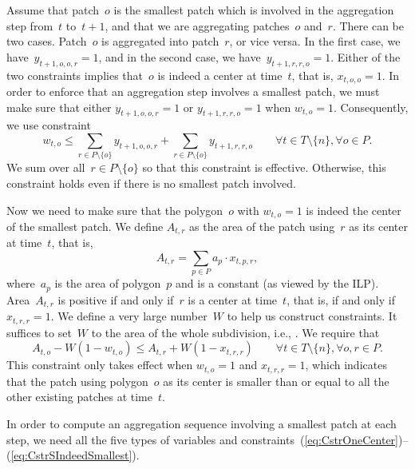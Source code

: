 Assume that patch~$o$ is the smallest patch
which is involved in the aggregation step from~$t$ to~$t+1$,
and that we are aggregating patches~$o$ and~$r$.
There can be two cases.
Patch~$o$ is aggregated into patch~$r$, or vice versa.
In the first case, we have~$y_{t+1,o,o,r}=1$,
and in the second case, we have~$y_{t+1,r,r,o}=1$.
Either of the two constraints implies 
that~$o$ is indeed a center at time~$t$, that is, $x_{t,o,o} =1$.
In order to enforce that
an aggregation step involves a smallest patch,
we must make sure that 
either $y_{t+1,o,o,r}=1$ or $y_{t+1,r,r,o}=1$ 
when $w_{t,o}=1$.
Consequently, we use constraint
\begin{equation}
\label{eq:CstrSInvolveSmallest}
w_{t,o} \le 
\sum_{r\in P\setminus \{o\}} y_{t+1,o,o,r} + 
\sum_{r\in P\setminus \{o\}} y_{t+1,r,r,o} \qquad
\forall t \in 
{T}\setminus \{n\}, \forall o \in P.
\end{equation}
We sum over all~$r\in P\setminus \{o\}$
so that this constraint is effective.
Otherwise, this constraint holds even if 
there is no smallest patch involved.

Now we need to make sure that 
the polygon~$o$ with $w_{t,o}=1$ is indeed 
the center of the smallest patch.
We define $A_{t,r}$ as the area of 
the patch using~$r$ as its center at time~$t$, 
that is,
\[
A_{t,r}=\sum_{p\in P} a_p \cdot x_{t,p,r},
\] 
where~$a_p$ is the area of polygon~$p$ 
and is a constant (as viewed by the ILP).
Area~$A_{t,r}$ is positive 
if and only if~$r$ is a center at time~$t$,
that is, if and only if~$x_{t,r,r}=1$.
We define a 
very large number~$W$ to help us construct constraints.
It suffices to set~$W$ to 
the area of the whole subdivision, i.e., \Pgoal. 
We require that
\begin{equation}
\label{eq:CstrSIndeedSmallest}
A_{t,o}-W(1-w_{t,o}) \le A_{t,r}+W(1-x_{t,r,r}) \qquad
\forall t 	 \in {T}\setminus \{n\}, 
\forall o, r \in P.
\end{equation}
This constraint only takes effect when $w_{t,o}=1$ and 
$x_{t,r,r}=1$, which indicates that 
the patch using polygon~$o$ as its center 
is smaller than or equal to all the other existing 
patches at time~$t$.

In order to compute an aggregation sequence 
involving a smallest patch at each step, 
we need all the five types of variables and 
constraints~(\ref{eq:CstrOneCenter})--(\ref{eq:CstrSIndeedSmallest}).



